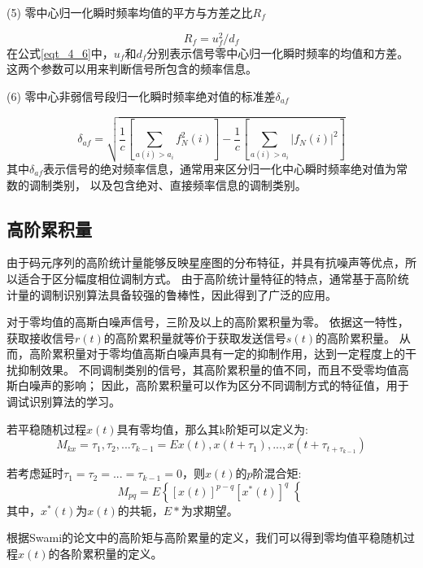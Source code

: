(5) 零中心归一化瞬时频率均值的平方与方差之比$R_f$\par
\begin{equation}
\label{eqt_4_6}
R_f = u_f^2 / d_f
\end{equation}
在公式\ref{eqt_4_6}中，$u_f$和$d_f$分别表示信号零中心归一化瞬时频率的均值和方差。
这两个参数可以用来判断信号所包含的频率信息。\par

(6) 零中心非弱信号段归一化瞬时频率绝对值的标准差$\delta_{af}$\par
\begin{equation}
\label{eqt_4_7}
\delta_{af} = \sqrt{\frac{1}{c}\left[\sum_{a(i)>a_i} f_N^2(i)\right]
	- \frac{1}{c}\left[\sum_{a(i)>a_i} \left|f_N(i)\right|^2\right]}
\end{equation}
其中$\delta_{af}$表示信号的绝对频率信息，通常用来区分归一化中心瞬时频率绝对值为常数的调制类别，
以及包含绝对、直接频率信息的调制类别。\par

\subsection{高阶累积量}

由于码元序列的高阶统计量能够反映星座图的分布特征，并具有抗噪声等优点，所以适合于区分幅度相位调制方式。
由于高阶统计量特征的特点，通常基于高阶统计量的调制识别算法具备较强的鲁棒性，因此得到了广泛的应用\cite{张利2017基于高阶累积量的调制识别算法的研究}\cite{李世平2011基于小波和高阶累积量的数字调制识别算法}\cite{韩钢2003基于高阶累积量和支撑矢量机的调制识别研究}\cite{陆凤波2008一种基于高阶累积量的数字调相信号识别方法}。\par

对于零均值的高斯白噪声信号，三阶及以上的高阶累积量为零。
依据这一特性，获取接收信号$r(t)$的高阶累积量就等价于获取发送信号$s(t)$的高阶累积量。
从而，高阶累积量对于零均值高斯白噪声具有一定的抑制作用，达到一定程度上的干扰抑制效果。
不同调制类别的信号，其高阶累积量的值不同，而且不受零均值高斯白噪声的影响；
因此，高阶累积量可以作为区分不同调制方式的特征值，用于调试识别算法的学习。\par

若平稳随机过程$x(t)$具有零均值，那么其k阶矩可以定义为:
\begin{equation}
\label{eqt_4_8}
M_{kx} = \tau_1, \tau_2, ... \tau_{k-1} = E{x(t), x(t+\tau_1), ..., x(t+\tau_{t+\tau_{k-1}})}
\end{equation}

若考虑延时$\tau_1 = \tau_2 = ... = \tau_{k-1} = 0$，则$x(t)$的$p$阶混合矩:
\begin{equation}
\label{eqt_4_9}
M_{pq} = E\left\lbrace \left[ x(t)\right]^{p-q} 
\left[ x^*(t)\right]^{q}\right\lbrace 
\end{equation}
其中，$x^*(t)$为$x(t)$的共轭，$E{*}$为求期望。\par
根据Swami\cite{swami2000hierarchical}的论文中的高阶矩与高阶累量的定义，我们可以得到零均值平稳随机过程$x(t)$的各阶累积量的定义。

